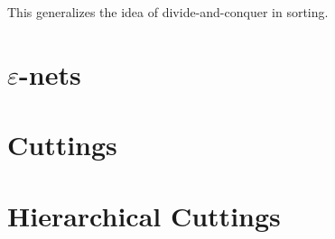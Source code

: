This generalizes the idea of divide-and-conquer in sorting.
\section{\(\varepsilon\)-nets}

\section{Cuttings}

\section{Hierarchical Cuttings}

